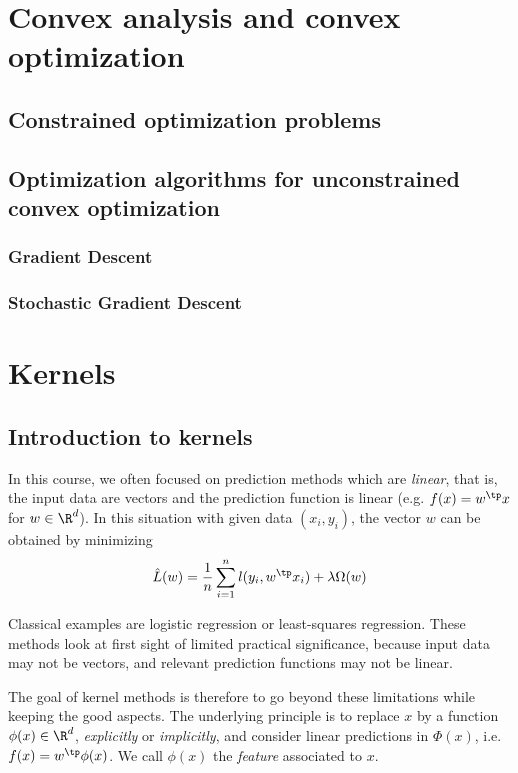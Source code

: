 \documentclass[toc]{../cs-classes/cs-classes}
\begin{document}
\section{Convex analysis and convex optimization}
\subsection{Constrained optimization problems}

\subsection{Optimization algorithms for unconstrained convex optimization}
\subsubsection{Gradient Descent}

\subsubsection{Stochastic Gradient Descent}

\section{Kernels}
\subsection{Introduction to kernels}
In this course, we often focused on prediction methods which are \emph{linear}, that is, the input data are vectors and the prediction function is linear (e.g. $f(x)=w^\tp x$ for $w\in\R^d$). In this situation with given data $(x_i, y_i)$, the vector $w$ can be obtained by minimizing
\begin{equation*}
    \hat{L}(w)=\frac{1}{n}\sum_{i=1}^n l(y_i, w^\tp x_i) + \lambda \Omega(w)
\end{equation*}

Classical examples are logistic regression or least-squares regression. These methods look at first sight of limited practical significance, because input data may not be vectors, and relevant prediction functions may not be linear.

The goal of kernel methods is therefore to go beyond these limitations while keeping the good aspects. The underlying principle is to replace $x$ by a function $\phi(x)\in\R^d$, \emph{explicitly} or \emph{implicitly}, and consider linear predictions in $\Phi(x)$, i.e.~$f(x)=w^\tp \phi(x)$. We call $\phi(x)$ the \emph{feature} associated to $x$.
\end{document}
